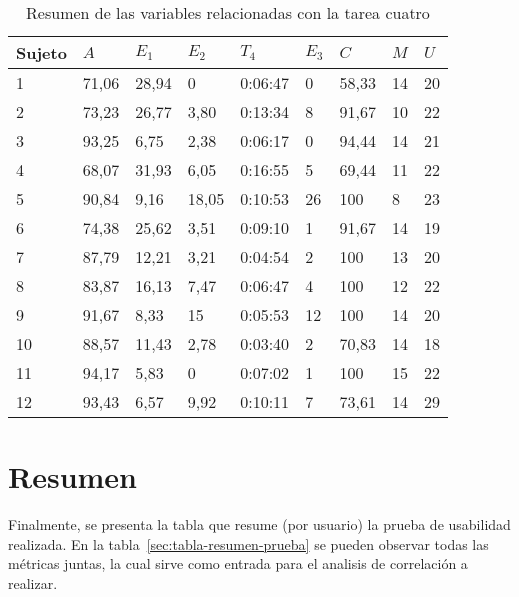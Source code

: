 \begin{table}[H]
\centering
\footnotesize
\begin{tabular}{|p{1.4cm}|p{1.4cm}|p{1.4cm}|p{1.4cm}|p{1.4cm}|p{1.4cm}|p{1.4cm}|p{1.4cm}|p{1.4cm}|}
\hline
Sujeto& $A$ & $E_1$ & $E_2$  & $T_4$      & $E_3$ & $C$ &  $M$ & $U$ \\
 \hline 
1  &  71,06 & 28,94 &  0     &  0:06:47   &  0  &  58,33  & 14 &  20  \\ 
2  &  73,23 & 26,77 &  3,80  &  0:13:34   &  8  &  91,67  & 10 &  22 \\
3  &  93,25 & 6,75  &  2,38  &  0:06:17   &  0  &  94,44  & 14 &  21 \\
4  &  68,07 & 31,93 &  6,05  &  0:16:55   &  5  &  69,44  & 11 &  22 \\
5  &  90,84 & 9,16  &  18,05 &  0:10:53   &  26 &  100      & 8  &  23 \\
6  &  74,38 & 25,62 &  3,51  &  0:09:10   &  1  &  91,67  & 14 &  19  \\
7  &  87,79 & 12,21 &  3,21  &  0:04:54   &  2  &  100      & 13 &  20  \\
8  &  83,87 & 16,13 &  7,47  &  0:06:47   &  4  &  100      & 12 &  22  \\
9  &  91,67 & 8,33  &  15    &  0:05:53   &  12 &  100      & 14 &  20  \\
10 &  88,57 & 11,43 &  2,78  &  0:03:40   &  2  &  70,83  & 14 &  18  \\
11 &  94,17 & 5,83  &  0     &  0:07:02   &  1  &  100      & 15 &  22  \\
12 &  93,43 & 6,57  &  9,92  &  0:10:11   &  7  &  73,61  & 14 &  29  \\
    \hline
\end{tabular}
\caption{Resumen de las variables relacionadas con la tarea cuatro}
\label{sec:tabla-tarea4}
\end{table}

 
\section{Resumen}

Finalmente, se presenta la tabla que resume (por usuario) la prueba de usabilidad realizada. En la tabla~\ref{sec:tabla-resumen-prueba}
se pueden observar todas las m\'etricas juntas, la cual sirve como entrada 
para el analisis de correlaci\'on a realizar.


